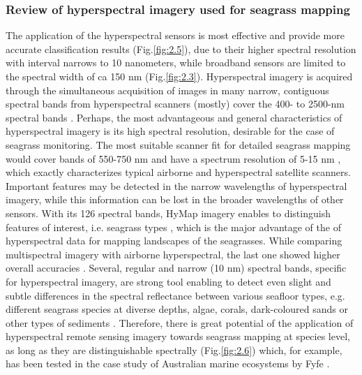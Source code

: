 \documentclass[11pt]{article}
\begin{document}
\subsubsection[Review of hyperspectral imagery...]{Review of hyperspectral imagery used for seagrass mapping}\label{sec:2.4.2}
The application of the hyperspectral sensors is most effective and provide more accurate classification
results  (Fig.\ref{fig:2.5}), due to their higher spectral resolution \cite{Bharathi03}\label{Bharathi03} with interval
narrows to 10 nanometers, while broadband sensors are limited to the spectral width of ca
150 nm  (Fig.\ref{fig:2.3}). 
Hyperspectral imagery is acquired through the simultaneous acquisition of images in many
narrow, contiguous spectral bands from hyperspectral scanners (mostly) cover the 400-
to 2500-nm spectral bands \cite{Schmidt03}\label{Schmidt03}.
Perhaps, the most advantageous and general characteristics of hyperspectral imagery is its
high spectral resolution, desirable for the case of seagrass monitoring. 
The most suitable
scanner fit for detailed seagrass mapping would cover bands of 550-750 nm and have a spectrum
resolution of 5-15 nm \cite{Fyfe04}\label{Fyfe04}, which exactly characterizes typical airborne and
hyperspectral satellite scanners. Important features may be detected in the narrow
wavelengths of hyperspectral imagery, while this information can be lost in the broader
wavelengths of other sensors. With its 126 spectral bands, \ac{HyMap} imagery enables to
distinguish features of interest, i.e. seagrass types \cite{Peneva07}\label{Peneva07}, which is the major
advantage of the of hyperspectral data for mapping landscapes of the seagrasses.
While comparing multispectral imagery with airborne hyperspectral, the last one showed higher
overall accuracies \cite{Phinn08}\label{Phinn08}. Several, regular and narrow (10 nm) spectral bands\label{sec:2.4.2}, specific for
hyperspectral imagery, are strong tool enabling to detect even slight and subtle differences in the
spectral reflectance between various seafloor types, e.g. different seagrass species at diverse depths,
algae, corals, dark-coloured sands or other types of sediments \cite{Hochberg03a}\label{Hochberg03a}. 
Therefore, there is great potential of the application of hyperspectral remote sensing imagery towards seagrass
mapping at species level, as long as they are distinguishable spectrally (Fig.\ref{fig:2.6}) which, for example, has been
tested in the case study of Australian marine ecosystems by Fyfe \cite{Fyfe04}\label{Fyfe04}. 
\end{document}
